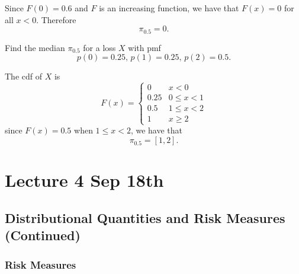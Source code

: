\documentclass[notoc,notitlepage]{tufte-book}
\begin{document}
\begin{solution}
  Since $F(0) = 0.6$ and $F$ is an increasing function, we have that $F(x) = 0$ for all $x < 0$. Therefore
  \begin{equation*}
    \pi_{0.5} = 0.
  \end{equation*}
\end{solution}

\begin{eg}
  Find the median $\pi_{0.5}$ for a loss $X$ with pmf
  \begin{equation*}
    p(0) = 0.25, \, p(1) = 0.25, \, p(2) = 0.5.
  \end{equation*}
\end{eg}

\begin{solution}
  The cdf of $X$ is
  \begin{equation*}
    F(x) = \begin{cases}
      0    & x < 0 \\
      0.25 & 0 \leq x < 1 \\
      0.5  & 1 \leq x < 2 \\
      1    & x \geq 2
    \end{cases}
  \end{equation*}
  since $F(x) = 0.5$ when $1 \leq x < 2$, we have that
  \begin{equation*}
    \pi_{0.5} = [1, 2].
  \end{equation*}
\end{solution}




\chapter{Lecture 4 Sep 18th}%
\label{chp:lecture_4_sep_18th}

\section{Distributional Quantities and Risk Measures (Continued)}%
\label{sec:distributional_quantities_and_risk_measures_continued}

\subsection{Risk Measures}%
\label{sub:risk_measures}
\end{document}
